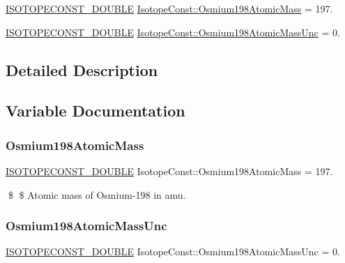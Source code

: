 \begin{DoxyCompactItemize}
\item 
\mbox{\hyperlink{group___isotope_const-_macros_ga8f45a7272ce02c0b4c65c44636ed719a}{I\+S\+O\+T\+O\+P\+E\+C\+O\+N\+S\+T\+\_\+\+D\+O\+U\+B\+LE}} \mbox{\hyperlink{group___isotope_const-_osmium-_os198_ga7fec85cf8f8784296f0e4ecd33388da1}{Isotope\+Const\+::\+Osmium198\+Atomic\+Mass}} = 197.
\item 
\mbox{\hyperlink{group___isotope_const-_macros_ga8f45a7272ce02c0b4c65c44636ed719a}{I\+S\+O\+T\+O\+P\+E\+C\+O\+N\+S\+T\+\_\+\+D\+O\+U\+B\+LE}} \mbox{\hyperlink{group___isotope_const-_osmium-_os198_ga42205cbdb5422159aaf1f6832e8895f2}{Isotope\+Const\+::\+Osmium198\+Atomic\+Mass\+Unc}} = 0.
\end{DoxyCompactItemize}


\subsection{Detailed Description}


\subsection{Variable Documentation}
\mbox{\label{group___isotope_const-_osmium-_os198_ga7fec85cf8f8784296f0e4ecd33388da1}} 
\subsubsection{\texorpdfstring{Osmium198\+Atomic\+Mass}{Osmium198AtomicMass}}
{\footnotesize\ttfamily \mbox{\hyperlink{group___isotope_const-_macros_ga8f45a7272ce02c0b4c65c44636ed719a}{I\+S\+O\+T\+O\+P\+E\+C\+O\+N\+S\+T\+\_\+\+D\+O\+U\+B\+LE}} Isotope\+Const\+::\+Osmium198\+Atomic\+Mass = 197.}

\$ \$ Atomic mass of Osmium-\/198 in amu. \mbox{\label{group___isotope_const-_osmium-_os198_ga42205cbdb5422159aaf1f6832e8895f2}} 
\subsubsection{\texorpdfstring{Osmium198\+Atomic\+Mass\+Unc}{Osmium198AtomicMassUnc}}
{\footnotesize\ttfamily \mbox{\hyperlink{group___isotope_const-_macros_ga8f45a7272ce02c0b4c65c44636ed719a}{I\+S\+O\+T\+O\+P\+E\+C\+O\+N\+S\+T\+\_\+\+D\+O\+U\+B\+LE}} Isotope\+Const\+::\+Osmium198\+Atomic\+Mass\+Unc = 0.}

